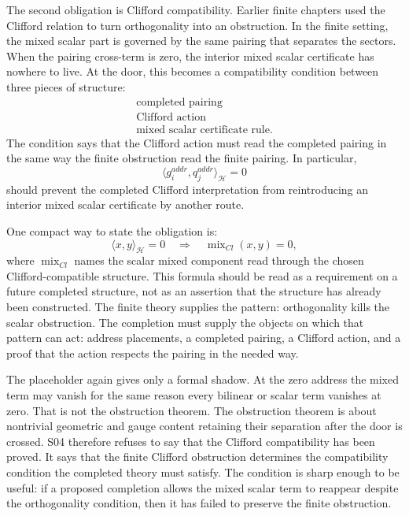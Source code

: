 The second obligation is Clifford compatibility. Earlier finite chapters used
the Clifford relation to turn orthogonality into an obstruction. In the finite
setting, the mixed scalar part is governed by the same pairing that separates
the sectors. When the pairing cross-term is zero, the interior mixed scalar
certificate has nowhere to live. At the door, this becomes a compatibility
condition between three pieces of structure:
\[
  \begin{array}{c}
  \text{completed pairing} \\
  \text{Clifford action} \\
  \text{mixed scalar certificate rule.}
  \end{array}
\]
The condition says that the Clifford action must read the completed pairing in
the same way the finite obstruction read the finite pairing. In particular,
\[
  \langle g_i^{addr},q_j^{addr}\rangle_{\mathcal H}=0
\]
should prevent the completed Clifford interpretation from reintroducing an
interior mixed scalar certificate by another route.

One compact way to state the obligation is:
\[
  \langle x,y\rangle_{\mathcal H}=0
  \quad\Longrightarrow\quad
  \operatorname{mix}_{Cl}(x,y)=0,
\]
where \(\operatorname{mix}_{Cl}\) names the scalar mixed component read through
the chosen Clifford-compatible structure. This formula should be read as a
requirement on a future completed structure, not as an assertion that the
structure has already been constructed. The finite theory supplies the pattern:
orthogonality kills the scalar obstruction. The completion must supply the
objects on which that pattern can act: address placements, a completed pairing,
a Clifford action, and a proof that the action respects the pairing in the
needed way.

The placeholder again gives only a formal shadow. At the zero address the mixed
term may vanish for the same reason every bilinear or scalar term vanishes at
zero. That is not the obstruction theorem. The obstruction theorem is about
nontrivial geometric and gauge content retaining their separation after the
door is crossed. S04 therefore refuses to say that the Clifford compatibility
has been proved. It says that the finite Clifford obstruction determines the
compatibility condition the completed theory must satisfy. The condition is
sharp enough to be useful: if a proposed completion allows the mixed scalar
term to reappear despite the orthogonality condition, then it has failed to
preserve the finite obstruction.

